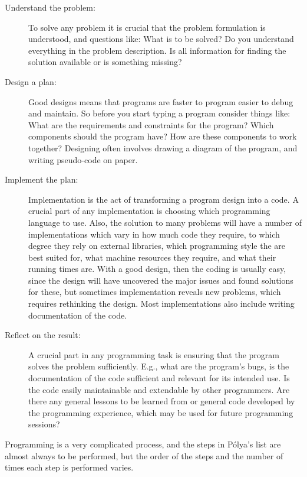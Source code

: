 \begin{description}
\item[Understand the problem:] To solve any problem it is crucial that the problem formulation is understood, and questions like: What is to be solved? Do you understand everything in the problem description. Is all information for finding the solution available or is something missing?
\item[Design a plan:] Good designs means that programs are faster to program easier to debug and maintain. So before you start typing a program consider things like: What are the requirements and constraints for the program? Which components should the program have? How are these components to work together? Designing often involves drawing a diagram of the program, and writing pseudo-code on paper.
\item[Implement the plan:] Implementation is the act of transforming a program design into a code. A crucial part of any implementation is choosing which programming language to use. Also, the solution to many problems will have a number of implementations which vary in how much code they require, to which degree they rely on external libraries, which programming style the are best suited for, what machine resources they require, and what their running times are.  With a good design, then the coding is usually easy, since the design will have uncovered the major issues and found solutions for these, but sometimes implementation reveals new problems, which requires rethinking the design. Most implementations also include writing documentation of the code.
\item[Reflect on the result:] A crucial part in any programming task is ensuring that the program solves the problem sufficiently. E.g., what are the program's bugs, is the documentation of the code sufficient and relevant for its intended use. Is the code easily maintainable and extendable by other programmers. Are there any general lessons to be learned from or general code developed by the programming experience, which may be used for future programming sessions?
\end{description}
Programming is a very complicated process, and the steps in Pólya's list are almost always to be performed, but the order of the steps and the number of times each step is performed varies. 

